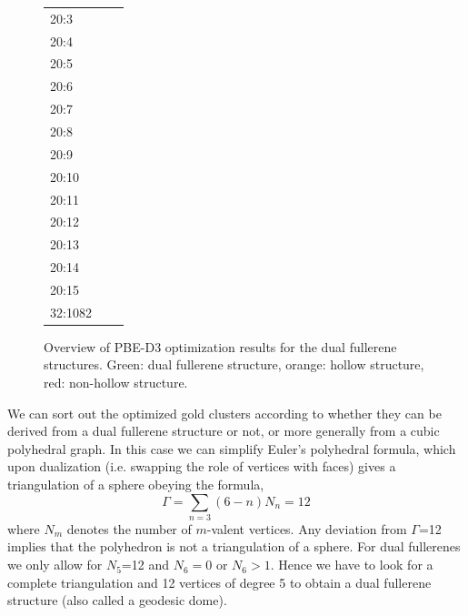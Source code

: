 \begin{figure}
\begin{tabular}{lp{3cm}|p{3cm}}
		20:3    & \cellcolor{myorange}        & \cellcolor{myorange}      \\
		20:4    & \cellcolor{mygreen}         & \cellcolor{mygreen}       \\
		20:5    & \cellcolor{mygreen}         & \cellcolor{mygreen}       \\
		20:6    & \cellcolor{myorange}        & \cellcolor{myorange}      \\
		20:7    & \cellcolor{myorange}        & \cellcolor{mygreen}       \\
		20:8    & \cellcolor{myorange}        & \cellcolor{myorange}      \\
		20:9    & \cellcolor{myorange}        & \cellcolor{myorange}      \\
		20:10   & \cellcolor{myorange}        & \cellcolor{myorange}      \\
		20:11   & \cellcolor{myorange}        & \cellcolor{myorange}      \\
		20:12   & \cellcolor{red}             & \cellcolor{red}           \\
		20:13   & \cellcolor{myorange}        & \cellcolor{myorange}      \\
		20:14   & \cellcolor{mygreen}         & \cellcolor{red}           \\
		20:15   & \cellcolor{myorange}        & \cellcolor{mygreen}       \\
		32:1082 & \cellcolor{mygreen}         & \cellcolor{mygreen}       \\ \bottomrule
	\end{tabular}
	\caption{Overview of PBE-D3 optimization results for the dual fullerene structures. 
	Green: dual fullerene structure, orange: hollow structure, red: non-hollow structure.}
	\label{fig:optOverview}
\end{figure}

We can sort out the optimized gold clusters according to whether they can
be derived from a dual fullerene structure or not, or more generally from a cubic polyhedral
graph. In this case 
we can simplify Euler's polyhedral formula, which upon dualization (i.e. swapping the role of vertices with faces)
gives a triangulation of a sphere obeying the formula,
\begin{equation}
\label{eq3valent} 
\Gamma=\sum_{n=3}(6-n)N_n = 12
\end{equation}
where $N_m$ denotes
the number of $m$-valent vertices. Any deviation from $\Gamma$=12 implies that the
polyhedron is not a triangulation of a sphere. For dual fullerenes we only allow for
$N_5$=12 and $N_6=0$ or $N_6>1$. Hence we have to look for a complete
triangulation and 12 vertices of degree 5 to obtain a dual fullerene
structure (also called a geodesic dome).

